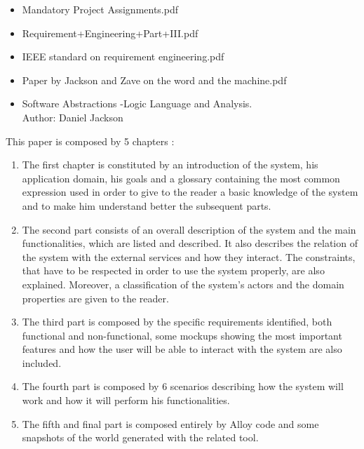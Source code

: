 \begin{itemize}
	\setlength{\leftskip}{0.5cm}
	\item Mandatory Project Assignments.pdf
	\item Requirement+Engineering+Part+III.pdf
	\item IEEE standard on requirement engineering.pdf
	\item Paper by Jackson and Zave on the word and the machine.pdf
	\item Software Abstractions -Logic Language and Analysis.\\
	Author: Daniel Jackson
\end{itemize}

This paper is composed by 5 chapters :
\begin{enumerate}
	\setlength{\leftskip}{0.5cm}
	\item The first chapter is constituted by an introduction of the system, his application domain, his goals and a glossary containing the most common expression used in order to give to the reader a basic knowledge of the system and to make him understand better the subsequent parts.
	\item The second part consists of an overall description of the system and the main functionalities, which are listed and described. It also describes the relation of the system with the external services and how they interact. The constraints, that have to be respected in order to use the system properly, are also explained.
	Moreover, a classification of the system’s actors and the domain properties are given to the reader.
	\item The third part is composed by the specific requirements identified, both functional and non-functional, some mockups showing the most important features and how the user will be able to interact with the system are also included.
	\item The fourth part is composed by 6 scenarios describing how the system will work and how it will perform his functionalities.
	\item The fifth and final part is composed entirely by Alloy code and some snapshots of the world generated with the related tool.
\end{enumerate}